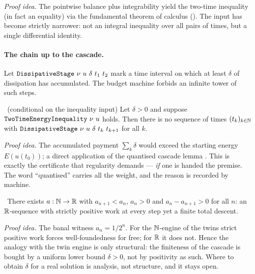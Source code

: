 \emph{Proof idea.} The pointwise balance plus integrability yield the two-time inequality (in fact
an equality) via the fundamental theorem of calculus
(). The input has become strictly narrower:
not an integral inequality over all pairs of times, but a single differential identity.

\paragraph{The chain up to the cascade.}
Let $\code{DissipativeStage}\ \nu\ u\ \delta\ t_1\ t_2$ mark a time interval on which at least
$\delta$ of dissipation has accumulated. The budget machine forbids an infinite tower of such steps.

\begin{theorem}\label{thm:ns_no_infinite_dissipative_cascade}
\green{}\ (conditional on the inequality input) Let $\delta > 0$ and suppose
$\code{TwoTimeEnergyInequality}\ \nu\ u$ holds. Then there is no sequence of times $(t_k)_{k\in\mathbb{N}}$
with $\code{DissipativeStage}\ \nu\ u\ \delta\ t_k\ t_{k+1}$ for all $k$.
\end{theorem}

\emph{Proof idea.} The accumulated payment $\sum_k \delta$ would exceed the starting energy
$E(u(t_0))$; a direct application of the quantised cascade lemma
. This is exactly the certificate that regularity
demands --- \emph{if} one is handed the premise. The word ``quantised'' carries all the weight, and
the reason is recorded by machine.

\begin{theorem}\label{thm:real_positive_work_not_wellfounded}
\green{}\ There exists $a : \mathbb{N} \to \mathbb{R}$ with $a_{n+1} < a_n$, $a_n > 0$ and $a_n - a_{n+1} > 0$ for
all $n$: an $\mathbb{R}$-sequence with strictly positive work at every step yet a finite total descent.
\end{theorem}

\emph{Proof idea.} The banal witness $a_n = 1/2^n$. For the $\mathbb{N}$-engine of the twins strict positive
work forces well-foundedness for free; for $\mathbb{R}$ it does not. Hence the analogy with the twin engine
is only structural: the finiteness of the cascade is bought by a uniform lower bound $\delta > 0$,
not by positivity as such. Where to obtain $\delta$ for a real solution is analysis, not structure,
and it stays open.

